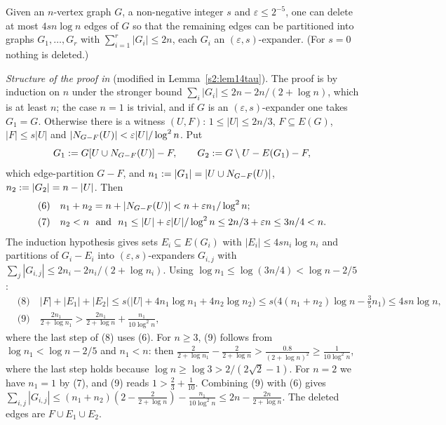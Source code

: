 \begin{citedresult}[{\cite[Lemma~14]{BM}}]\label{s1:citLem14}
Given an $n$-vertex graph $G$, a non-negative integer $s$ and
$\varepsilon\le2^{-5}$, one can delete at most $4sn\log n$ edges of $G$ so that
the remaining edges can be partitioned into graphs $G_1,\dots,G_r$ with
$\sum_{i=1}^r|G_i|\le2n$, each $G_i$ an $(\varepsilon,s)$-expander. (For $s=0$
nothing is deleted.)

\emph{Structure of the proof in \cite{BM}} (modified in
Lemma~\ref{s2:lem14tau}). The proof is by induction on $n$ under the stronger
bound $\sum_i|G_i|\le2n-2n/(2+\log n)$, which is at least $n$; the case $n=1$ is
trivial, and if $G$ is an $(\varepsilon,s)$-expander one takes $G_1=G$.
Otherwise there is a witness $(U,F)$: $1\le|U|\le2n/3$, $F\subseteq E(G)$,
$|F|\le s|U|$ and $|N_{G-F}(U)|<\varepsilon|U|/\log^2n$. Put
\[
G_1\mathrel{:=} G[U\cup N_{G-F}(U)]-F,\qquad
G_2\mathrel{:=} G\setminus U-E(G_1)-F,
\]
which edge-partition $G-F$, and $n_1\mathrel{:=}|G_1|=|U\cup N_{G-F}(U)|$,
$n_2\mathrel{:=}|G_2|=n-|U|$. Then
\begin{align*}
&\text{(6)}\quad n_1+n_2=n+|\Nbr_{G-F}(U)|<n+\varepsilon n_1/\log^2n;\\
&\text{(7)}\quad n_2<n\ \text{ and }\ n_1\le|U|+\varepsilon|U|/\log^2n\le
2n/3+\varepsilon n\le3n/4<n.
\end{align*}
The induction hypothesis gives sets $E_i\subseteq E(G_i)$ with $|E_i|\le4sn_i\log
n_i$ and partitions of $G_i-E_i$ into $(\varepsilon,s)$-expanders $G_{i,j}$ with
$\sum_j|G_{i,j}|\le2n_i-2n_i/(2+\log n_i)$. Using $\log n_1\le\log(3n/4)<\log
n-2/5$:
\begin{align*}
&\text{(8)}\quad |F|+|E_1|+|E_2|\le s\bigl(|U|+4n_1\log n_1+4n_2\log n_2\bigr)
\le s\bigl(4(n_1+n_2)\log n-\tfrac35n_1\bigr)\le4sn\log n,\\
&\text{(9)}\quad \frac{2n_1}{2+\log n_1}>\frac{2n_1}{2+\log
n}+\frac{n_1}{10\log^2n},
\end{align*}
where the last step of (8) uses (6). For $n\ge3$, (9) follows from $\log
n_1<\log n-2/5$ and $n_1<n$: then $\frac2{2+\log n_1}-\frac2{2+\log
n}>\frac{0.8}{(2+\log n)^2}\ge\frac1{10\log^2n}$, where the last step holds
because $\log n\ge\log3>2/(2\sqrt2-1)$. For $n=2$ we have $n_1=1$ by (7), and
(9) reads $1>\frac23+\frac1{10}$. Combining (9) with (6) gives
$\sum_{i,j}|G_{i,j}|\le(n_1+n_2)(2-\frac{2}{2+\log n})-\frac{n_1}{10\log^2n}\le
2n-\frac{2n}{2+\log n}$. The deleted edges are $F\cup E_1\cup E_2$.

\end{citedresult}


